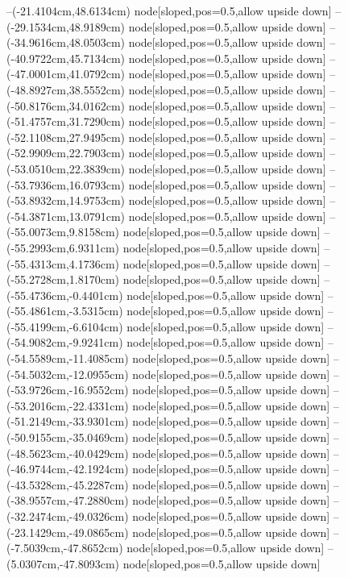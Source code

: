 --(-21.4104cm,48.6134cm) node[sloped,pos=0.5,allow upside down]{\ArrowIn}
--(-29.1534cm,48.9189cm) node[sloped,pos=0.5,allow upside down]{\ArrowIn}
--(-34.9616cm,48.0503cm) node[sloped,pos=0.5,allow upside down]{\ArrowIn}
--(-40.9722cm,45.7134cm) node[sloped,pos=0.5,allow upside down]{\ArrowIn}
--(-47.0001cm,41.0792cm) node[sloped,pos=0.5,allow upside down]{\ArrowIn}
--(-48.8927cm,38.5552cm) node[sloped,pos=0.5,allow upside down]{\ArrowIn}
--(-50.8176cm,34.0162cm) node[sloped,pos=0.5,allow upside down]{\ArrowIn}
--(-51.4757cm,31.7290cm) node[sloped,pos=0.5,allow upside down]{\ArrowIn}
--(-52.1108cm,27.9495cm) node[sloped,pos=0.5,allow upside down]{\ArrowIn}
--(-52.9909cm,22.7903cm) node[sloped,pos=0.5,allow upside down]{\ArrowIn}
--(-53.0510cm,22.3839cm) node[sloped,pos=0.5,allow upside down]{\arrowIn}
--(-53.7936cm,16.0793cm) node[sloped,pos=0.5,allow upside down]{\ArrowIn}
--(-53.8932cm,14.9753cm) node[sloped,pos=0.5,allow upside down]{\ArrowIn}
--(-54.3871cm,13.0791cm) node[sloped,pos=0.5,allow upside down]{\ArrowIn}
--(-55.0073cm,9.8158cm) node[sloped,pos=0.5,allow upside down]{\ArrowIn}
--(-55.2993cm,6.9311cm) node[sloped,pos=0.5,allow upside down]{\ArrowIn}
--(-55.4313cm,4.1736cm) node[sloped,pos=0.5,allow upside down]{\ArrowIn}
--(-55.2728cm,1.8170cm) node[sloped,pos=0.5,allow upside down]{\ArrowIn}
--(-55.4736cm,-0.4401cm) node[sloped,pos=0.5,allow upside down]{\ArrowIn}
--(-55.4861cm,-3.5315cm) node[sloped,pos=0.5,allow upside down]{\ArrowIn}
--(-55.4199cm,-6.6104cm) node[sloped,pos=0.5,allow upside down]{\ArrowIn}
--(-54.9082cm,-9.9241cm) node[sloped,pos=0.5,allow upside down]{\ArrowIn}
--(-54.5589cm,-11.4085cm) node[sloped,pos=0.5,allow upside down]{\ArrowIn}
--(-54.5032cm,-12.0955cm) node[sloped,pos=0.5,allow upside down]{\arrowIn}
--(-53.9726cm,-16.9552cm) node[sloped,pos=0.5,allow upside down]{\ArrowIn}
--(-53.2016cm,-22.4331cm) node[sloped,pos=0.5,allow upside down]{\ArrowIn}
--(-51.2149cm,-33.9301cm) node[sloped,pos=0.5,allow upside down]{\ArrowIn}
--(-50.9155cm,-35.0469cm) node[sloped,pos=0.5,allow upside down]{\ArrowIn}
--(-48.5623cm,-40.0429cm) node[sloped,pos=0.5,allow upside down]{\ArrowIn}
--(-46.9744cm,-42.1924cm) node[sloped,pos=0.5,allow upside down]{\ArrowIn}
--(-43.5328cm,-45.2287cm) node[sloped,pos=0.5,allow upside down]{\ArrowIn}
--(-38.9557cm,-47.2880cm) node[sloped,pos=0.5,allow upside down]{\ArrowIn}
--(-32.2474cm,-49.0326cm) node[sloped,pos=0.5,allow upside down]{\ArrowIn}
--(-23.1429cm,-49.0865cm) node[sloped,pos=0.5,allow upside down]{\ArrowIn}
--(-7.5039cm,-47.8652cm) node[sloped,pos=0.5,allow upside down]{\ArrowIn}
--(5.0307cm,-47.8093cm) node[sloped,pos=0.5,allow upside down]{\ArrowIn}
